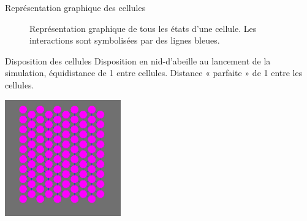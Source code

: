 \documentclass{beamer}
\begin{document}
\begin{frame}{Représentation graphique des cellules}
  \begin{figure}
    \caption{Représentation graphique de tous les états d'une cellule. Les interactions sont symbolisées par des lignes bleues.}
  \end{figure}
\end{frame}

\begin{frame}{Disposition des cellules}
  Disposition en nid-d'abeille au lancement de la simulation, équidistance de 1 entre cellules.
  Distance « parfaite » de 1 entre les cellules.
  \begin{center}
    \includegraphics[width=5cm]{Images/hexagone.png}
  \end{center}
\end{frame}
\end{document}
